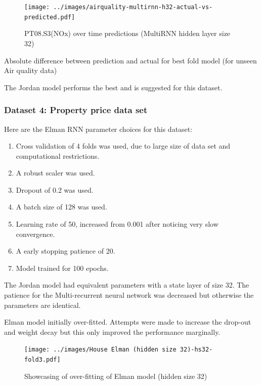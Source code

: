 \documentclass[conference]{IEEEtran}
\begin{document}
\begin{figure}[H] 
	\centering
	\texttt{[image: ../images/airquality-multirnn-h32-actual-vs-predicted.pdf]}
	\caption{PT08.S3(NOx) over time predictions (MultiRNN hidden layer size 32)}
	\label{fig:aq-predictions-multi}
\end{figure}


\begin{table}[H]
	\caption{Absolute difference between prediction and actual for best fold model (for unseen Air quality data)}
	\label{tab:weather-rnn-summary}
\end{table}

The Jordan model performs the best and is suggested for this dataset.

\subsubsection{Dataset 4: Property price data set}

Here are the Elman RNN parameter choices for this dataset:

\begin{enumerate}[]
	\item Cross validation of 4 folds was used, due to large size of data set and computational restrictions.
	\item A robust scaler was used.
	\item Dropout of 0.2 was used.
	\item A batch size of 128 was used.
	\item Learning rate of 50, increased from 0.001 after noticing very slow convergence.
	\item A early stopping patience of 20.
	\item Model trained for 100 epochs.
\end{enumerate}

The Jordan model had equivalent parameters with a state layer of size 32. The patience for the Multi-recurrent neural network was decreased but otherwise the parameters are identical.

Elman model initially over-fitted. Attempts were made to increase the drop-out and weight decay but this only improved the performance marginally.

\begin{figure}[H] 
	\centering
	\texttt{[image: ../images/House Elman (hidden size 32)-hs32-fold3.pdf]}
	\caption{Showcasing of over-fitting of Elman model (hidden size 32)}
	\label{fig:overfit-elman-prop}
\end{figure}
\end{document}
